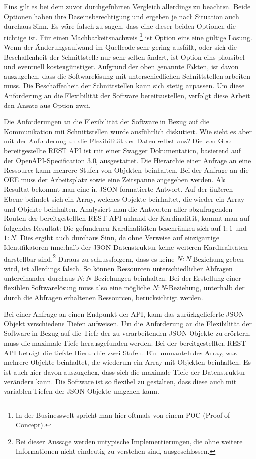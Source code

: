 Eins gilt es bei dem zuvor durchgeführten Vergleich allerdings zu beachten. Beide Optionen haben ihre Daseinsberechtigung
und ergeben je nach Situation auch durchaus Sinn. Es wäre falsch zu sagen, dass eine dieser beiden Optionen die richtige ist. Für einen
Machbarkeitsnachweis \footnote{In der Businesswelt spricht man hier oftmals von einem POC (Proof of Concept).}
ist Option eins eine gültige Lösung. Wenn der Änderungsaufwand im Quellcode sehr gering ausfällt, oder sich
die Beschaffenheit der Schnittstelle nur sehr selten ändert, ist Option eins plausibel und eventuell kostengünstiger.
Aufgrund der oben genannte Fakten, ist davon auszugehen, dass die Softwarelösung mit unterschiedlichen Schnittstellen arbeiten muss.
Die Beschaffenheit der Schnittstellen kann sich stetig anpassen. Um diese Anforderung an die Flexibilität
der Software bereitzustellen, verfolgt diese Arbeit den Ansatz aus Option zwei.

Die Anforderungen an die Flexibilität der Software in Bezug auf die Kommunikation mit Schnittstellen wurde
ausführlich diskutiert. Wie sieht es aber mit der Anforderung an die Flexibilität der Daten selbst aus?
Die von Gbo bereitgestellte REST API ist mit einer Swagger Dokumentation, basierend auf der
OpenAPI-Specification 3.0, ausgestattet. Die Hierarchie einer Anfrage an eine Ressource kann mehrere Stufen von Objekten beinhalten.
Bei der Anfrage an die OEE muss der Arbeitsplatz sowie eine Zeitspanne angegeben werden. Als Resultat bekommt man eine 
in JSON formatierte Antwort. Auf der äußeren Ebene befindet sich ein Array, welches Objekte beinhaltet, die wieder ein
Array und Objekte beinhalten. Analysiert man die Antworten aller abzufragenden Routen der bereitgestellten REST API anhand der Kardinalität,
kommt man auf folgendes Resultat: Die gefundenen Kardinalitäten beschränken sich auf \(1:1\) und \(1:N\). Dies ergibt auch
durchaus Sinn, da ohne Verweise auf einzigartige Identifikatoren innerhalb der JSON Datenstruktur keine weiteren
Kardinalitäten darstellbar sind.\footnote{Bei dieser Aussage werden untypische Implementierungen,
die ohne weitere Informationen nicht eindeutig zu verstehen sind, ausgeschlossen.}
Daraus zu schlussfolgern, dass es keine \(N:N\)-Beziehung geben wird, ist allerdings falsch.
So können Ressourcen unterschiedlicher Abfragen untereinander durchaus \(N:N\)-Beziehungen beinhalten. Bei der Erstellung
einer flexiblen Softwarelösung muss also eine mögliche \(N:N\)-Beziehung, unterhalb der durch die Abfragen erhaltenen
Ressourcen, berücksichtigt werden.

Bei einer Anfrage an einen Endpunkt der API, kann das zurückgelieferte JSON-Objekt verschiedene Tiefen aufweisen. 
Um die Anforderung an die Flexibilität der Software in Bezug auf die Tiefe der zu verarbeitenden JSON-Objekte zu
erörtern, muss die maximale Tiefe herausgefunden werden. Bei der bereitgestellten REST API beträgt die tiefste
Hierarchie zwei Stufen. Ein ummantelndes Array, was mehrere Objekte beinhaltet, die wiederum ein Array mit Objekten
beinhalten. Es ist auch hier davon auszugehen, dass sich die maximale Tiefe der Datenstruktur verändern kann.
Die Software ist so flexibel zu gestalten, dass diese auch mit variablen Tiefen der JSON-Objekte umgehen kann.


